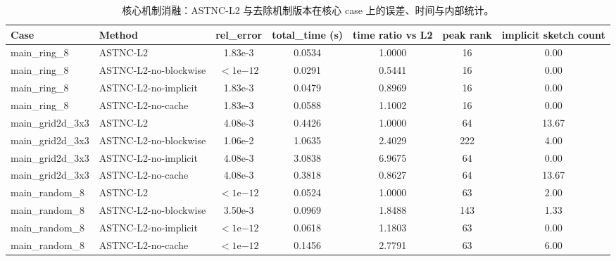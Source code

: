 ﻿\begin{table}[t]
\centering
\small
\caption{核心机制消融：ASTNC-L2 与去除机制版本在核心 case 上的误差、时间与内部统计。}
\label{tab:ablation-core}
\begin{tabular}{llccccc}
\toprule
Case & Method & rel\_error & total\_time (s) & time ratio vs L2 & peak rank & implicit sketch count \\
\midrule
main\_ring\_8 & ASTNC-L2 & 1.83e-3 & 0.0534 & 1.0000 & 16 & 0.00 \\
main\_ring\_8 & ASTNC-L2-no-blockwise & $<1\mathrm{e}{-12}$ & 0.0291 & 0.5441 & 16 & 0.00 \\
main\_ring\_8 & ASTNC-L2-no-implicit & 1.83e-3 & 0.0479 & 0.8969 & 16 & 0.00 \\
main\_ring\_8 & ASTNC-L2-no-cache & 1.83e-3 & 0.0588 & 1.1002 & 16 & 0.00 \\
\midrule
main\_grid2d\_3x3 & ASTNC-L2 & 4.08e-3 & 0.4426 & 1.0000 & 64 & 13.67 \\
main\_grid2d\_3x3 & ASTNC-L2-no-blockwise & 1.06e-2 & 1.0635 & 2.4029 & 222 & 4.00 \\
main\_grid2d\_3x3 & ASTNC-L2-no-implicit & 4.08e-3 & 3.0838 & 6.9675 & 64 & 0.00 \\
main\_grid2d\_3x3 & ASTNC-L2-no-cache & 4.08e-3 & 0.3818 & 0.8627 & 64 & 13.67 \\
\midrule
main\_random\_8 & ASTNC-L2 & $<1\mathrm{e}{-12}$ & 0.0524 & 1.0000 & 63 & 2.00 \\
main\_random\_8 & ASTNC-L2-no-blockwise & 3.50e-3 & 0.0969 & 1.8488 & 143 & 1.33 \\
main\_random\_8 & ASTNC-L2-no-implicit & $<1\mathrm{e}{-12}$ & 0.0618 & 1.1803 & 63 & 0.00 \\
main\_random\_8 & ASTNC-L2-no-cache & $<1\mathrm{e}{-12}$ & 0.1456 & 2.7791 & 63 & 6.00 \\
\bottomrule
\end{tabular}
\end{table}
